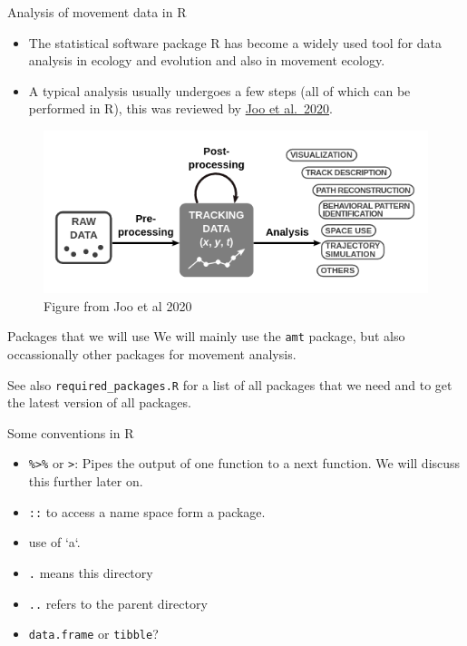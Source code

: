 \documentclass[ignorenonframetext,,t]{beamer}
\providecommand{\tightlist}{%
\setlength{\itemsep}{0pt}\setlength{\parskip}{0pt}}
\providecommand{\tightlist}{%
\setlength{\itemsep}{0pt}\setlength{\parskip}{0pt}}
\renewcommand{\tightlist}{\setlength{\itemsep}{1.4ex}\setlength{\parskip}{0pt}}
\begin{document}
\begin{frame}{Analysis of movement data in R}
\protect\hypertarget{analysis-of-movement-data-in-r}{}
\begin{itemize}
\item
  The statistical software package R has become a widely used tool for
  data analysis in ecology and evolution and also in movement ecology.
\item
  A typical analysis usually undergoes a few steps (all of which can be
  performed in R), this was reviewed by
  \href{https://besjournals.onlinelibrary.wiley.com/doi/full/10.1111/1365-2656.13116}{Joo
  et al.~2020}.
\end{itemize}

\begin{figure}

{\centering \includegraphics[width=0.75\linewidth]{img/joo2020} 

}

\caption{Figure from Joo et al 2020}\label{fig:unnamed-chunk-1}
\end{figure}
\end{frame}

\begin{frame}[fragile]
\begin{block}{Packages that we will use}
\protect\hypertarget{packages-that-we-will-use}{}
We will mainly use the \texttt{amt} package, but also occassionally
other packages for movement analysis.

See also \texttt{required\_packages.R} for a list of all packages that
we need and to get the latest version of all packages.
\end{block}
\end{frame}

\begin{frame}[fragile]{Some conventions in R}
\protect\hypertarget{some-conventions-in-r}{}
\begin{itemize}
\tightlist
\item
  \texttt{\%\textgreater{}\%} or \texttt{\textbar{}\textgreater{}}:
  Pipes the output of one function to a next function. We will discuss
  this further later on.
\item
  \texttt{::} to access a name space form a package.
\item
  use of `a`.
\item
  \texttt{.} means this directory
\item
  \texttt{..} refers to the parent directory
\item
  \texttt{data.frame} or \texttt{tibble}?
\end{itemize}
\end{frame}
\end{document}
